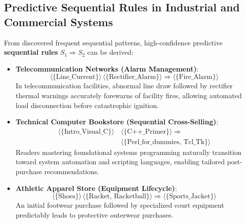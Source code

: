 \subsection{Predictive Sequential Rules in Industrial and Commercial Systems}
From discovered frequent sequential patterns, high-confidence predictive \textbf{sequential rules} $S_1 \Longrightarrow S_2$ can be derived:
\begin{itemize}
    \item \textbf{Telecommunication Networks (Alarm Management)}:
    \begin{equation}
    \langle \{\text{Line\_Current}\} \rangle \, \langle \{\text{Rectifier\_Alarm}\} \rangle \Longrightarrow \langle \{\text{Fire\_Alarm}\} \rangle
    \end{equation}
    In telecommunication facilities, abnormal line draw followed by rectifier thermal warnings accurately forewarns of facility fires, allowing automated load disconnection before catastrophic ignition.
    
    \item \textbf{Technical Computer Bookstore (Sequential Cross-Selling)}:
    \begin{equation}
    \begin{split}
    \langle \{\text{Intro\_Visual\_C}\} \rangle \, &\langle \{\text{C++\_Primer}\} \rangle \Longrightarrow \\
    &\langle \{\text{Perl\_for\_dummies, Tcl\_Tk}\} \rangle
    \end{split}
    \end{equation}
    Readers mastering foundational systems programming naturally transition toward system automation and scripting languages, enabling tailored post-purchase recommendations.
    
    \item \textbf{Athletic Apparel Store (Equipment Lifecycle)}:
    \begin{equation}
    \langle \{\text{Shoes}\} \rangle \, \langle \{\text{Racket, Racketball}\} \rangle \Longrightarrow \langle \{\text{Sports\_Jacket}\} \rangle
    \end{equation}
    An initial footwear purchase followed by specialized court equipment predictably leads to protective outerwear purchases.
\end{itemize}

